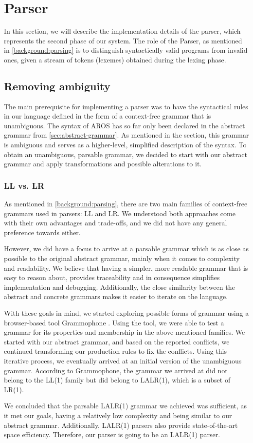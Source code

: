 \section{Parser}
\label{sec:parser}
In this section, we will describe the implementation details of the parser, which represents the second phase of our system. The role of the Parser, as mentioned in \cref{background:parsing} is to distinguish syntactically valid programs from invalid ones, given a stream of tokens (lexemes) obtained during the lexing phase.  
\subsection{Removing ambiguity}
The main prerequisite for implementing a parser was to have the syntactical rules in our language defined in the form of a context-free grammar that is unambiguous. The syntax of AROS has so far only been declared in the abstract grammar from \cref{sec:abstract-grammar}. As mentioned in the section, this grammar is ambiguous and serves as a higher-level, simplified description of the syntax. To obtain an unambiguous, parsable grammar, we decided to start with our abstract grammar and apply transformations and possible alterations to it.
\subsubsection{LL vs. LR}
\par
As mentioned in \cref{background:parsing}, there are two main families of context-free grammars used in parsers: LL and LR. We understood both approaches come with their own advantages and trade-offs, and we did not have any general preference towards either. 
\par However, we did have a focus to arrive at a parsable grammar which is as close as possible to the original abstract grammar, mainly when it comes to complexity and readability. We believe that having a simpler, more readable grammar that is easy to reason about, provides traceability and in consequence simplifies implementation and debugging. Additionally, the close similarity between the abstract and concrete grammars makes it easier to iterate on the language.  
\par
With these goals in mind, we started exploring possible forms of grammar using a browser-based tool Grammophone \cite{grammophone}. Using the tool, we were able to test a grammar for its properties and membership in the above-mentioned families. We started with our abstract grammar, and based on the reported conflicts, we continued transforming our production rules to fix the conflicts. Using this iterative process, we eventually arrived at an initial version of the unambiguous grammar. According to Grammophone, the grammar we arrived at did not belong to the LL(1) family but did belong to LALR(1), which is a subset of LR(1). 
\par 
We concluded that the parsable LALR(1) grammar we achieved was sufficient, as it met our goals, having a relatively low complexity and being similar to our abstract grammar. Additionally, LALR(1) parsers also provide state-of-the-art space efficiency. \cite{craftingCompiler} Therefore, our parser is going to be an LALR(1) parser. 

